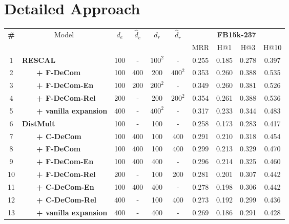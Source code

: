 \documentclass[letterpaper]{article} \usepackage{aaai20}  \usepackage{times}  \usepackage{helvet} \usepackage{courier}  \usepackage{booktabs}
\begin{document}
\section{Detailed Approach}



\begin{table*}[t]
    \centering
    \begin{tabular}{|c|l|cccc|cccc|}
    \toprule
        \multirow{2}{*}{\bf \#}&\multirow{2}{*}{~~~~~~~~~Model} & \multirow{2}{*}{$d_e$} &
        \multirow{2}{*}{$\hat{d}_e$} &
        \multirow{2}{*}{$d_r$} &
        \multirow{2}{*}{$\hat{d}_r$} &
        \multicolumn{4}{|c|}{\textbf{FB15k-237}}   \\
       &  & & & & &  MRR & H@1 & H@3&  H@10\\
         \midrule
         1 & \textbf{RESCAL} & 100 & - & $100^2$ & - & 0.255 & 0.185 & 0.278 & 0.397 \\
         2 & ~~~~\textbf{+ F-DeCom} & 100 & 400 & 200 & $400^2$ & 0.353 & 0.260 & 0.388 & 0.535\\
         3 &~~~~\textbf{+ F-DeCom-En} & 100 & 200 & $200^2$ & - & 0.349 & 0.260 & 0.381 & 0.526\\
         4 &~~~~\textbf{+ F-DeCom-Rel} & 200 & - & 200 & $200^2$ & 0.354 & 0.261 & 0.388 & 0.536 \\
         5 &~~~~\textbf{+ vanilla expansion} & 400 & - & $400^2$ & - & 0.317 & 0.233 & 0.344 & 0.483\\
         \midrule
         6 &\textbf{DistMult} & 100 & - & 100 & - &0.258 & 0.173 & 0.283 & 0.417\\
         7 &~~~~\textbf{+ C-DeCom} & 100 & 400 & 100 & 400 & 0.291 & 0.210 & 0.318 & 0.454\\
         8 &~~~~\textbf{+ F-DeCom} & 100 & 400 & 100 & 400 & 0.299 & 0.213 & 0.329 & 0.470\\
         9 &~~~~\textbf{+ F-DeCom-En} & 100 & 400 & 400 & - & 0.296 & 0.214 & 0.325 & 0.460\\
         10 &~~~~\textbf{+ F-DeCom-Rel} & 200 & - & 100 & 200 & 0.281 & 0.201 & 0.307 & 0.442\\
         11 &~~~~\textbf{+ C-DeCom-En} & 100 & 400 & 400 & - & 0.278 & 0.198 & 0.306 & 0.442\\
         12 &~~~~\textbf{+ C-DeCom-Rel} & 400 & - & 100 & 400 & 0.273 & 0.192 & 0.299 & 0.436\\
         13 &~~~~\textbf{+ vanilla expansion} & 400 & - & 400 & - & 0.269 & 0.186 & 0.291 & 0.428\\

\end{tabular}
\end{table*}
\end{document}
